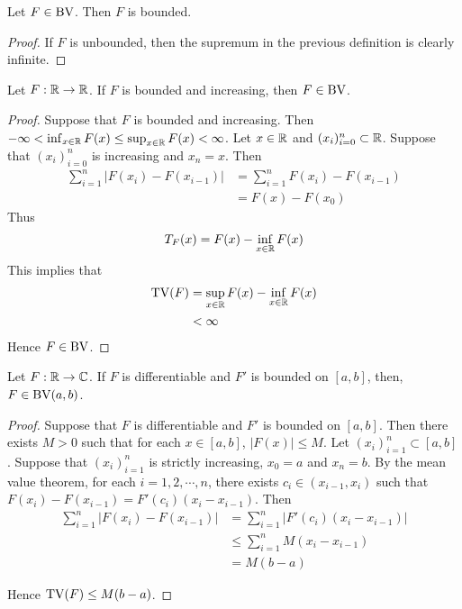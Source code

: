 \documentclass{book}
\begin{document}
	\begin{ex}  
		Let $F \in \text{BV}$. Then $F$ is bounded.
	\end{ex}
	
	\begin{proof}
		If $F$ is unbounded, then the supremum in the previous definition is clearly infinite.
	\end{proof}
	
	\begin{ex}  
		Let $F:\mathbb{R} \rightarrow \mathbb{R}$. If $F$ is bounded and increasing, then $F \in \text{BV}$.
	\end{ex}
	
	\begin{proof}
		Suppose that $F$ is bounded and increasing. Then $-\infty<\inf_{x \in \mathbb{R}}F(x) \leq \sup_{x \in \mathbb{R}}F(x)<\infty$. Let $x \in \mathbb{R}$ and $(x_i)_{i=0}^n \subset \mathbb{R}$. Suppose that $(x_i)_{i=0}^n$ is increasing and $x_n=x$. Then 
		\begin{align*}
			\sum_{i=1}^n|F(x_i)-F(x_{i-1})| 
			&= \sum_{i=1}^n F(x_i)-F(x_{i-1})\\
			&= F(x)-F(x_0)
		\end{align*}
		Thus 
		$$T_F(x) = F(x)-\inf_{x \in \mathbb{R}}F(x)$$ 
		This implies that 
		\begin{align*}
			\text{TV}(F) 
			&= \sup_{x \in \mathbb{R}}F(x)-\inf_{x \in \mathbb{R}}F(x)\\
			&<\infty
		\end{align*}
		Hence $F \in \text{BV}$.
	\end{proof}
	
	\begin{ex}  
		Let $F:\mathbb{R} \rightarrow \mathbb{C}$. If $F$ is differentiable and $F'$ is bounded on $[a,b]$, then, $F \in \text{BV}(a,b)$. 
	\end{ex}
	
	\begin{proof}
		Suppose that $F$ is differentiable and $F'$ is bounded on $[a,b]$. Then there exists $M>0$ such that for each $x \in [a,b]$, $|F(x)| \leq M$. Let $(x_i)_{i=1}^n \subset [a,b]$. Suppose that $(x_i)_{i=1}^n$ is strictly increasing, $x_0=a$ and $x_n=b$. By the mean value theorem, for each $i =1,2, \cdots, n$, there exists $c_i\in (x_{i-1}, x_i)$ such that $F(x_i)-F(x_{i-1})=F'(c_i)(x_i-x_{i-1})$. Then 
		\begin{align*}
			\sum_{i=1}^n|F(x_i)-F(x_{i-1})|
			&= \sum_{i=1}^n|F'(c_i)(x_i-x_{i-1})|\\
			&\leq  \sum_{i=1}^nM(x_i-x_{i-1})\\
			&=M(b-a)
		\end{align*}
		
		Hence $\text{TV}(F) \leq M(b-a)$.
	\end{proof}
	
\end{document}
